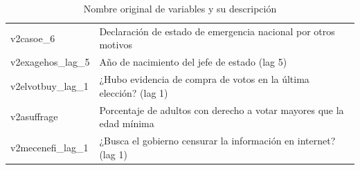 \documentclass{article}
\begin{document}
\begin{table}[H]
\begin{tabular}{ll}
  v2casoe\_6 & Declaración de estado de emergencia nacional por otros motivos \\
  v2exagehos\_lag\_5 & Año de nacimiento del jefe de estado (lag 5) \\
  v2elvotbuy\_lag\_1 & ¿Hubo evidencia de compra de votos en la última elección? (lag 1) \\
  v2asuffrage & Porcentaje de adultos con derecho a votar mayores que la edad mínima \\
  v2mecenefi\_lag\_1 & ¿Busca el gobierno censurar la información en internet? (lag 1) \\
  \bottomrule
  \end{tabular}
 \caption{Nombre original de variables y su descripción \label{tab:vars}}
\end{table}

\printbibliography
\end{document}

